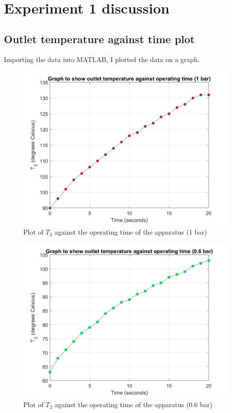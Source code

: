\documentclass[class=article, crop=false, 12pt,a4paper]{standalone}
\begin{document}
\section{Experiment 1 discussion}
\subsection{Outlet temperature against time plot}
Importing the data into MATLAB, I plotted the data on a graph.
\begin{figure}
  \includegraphics[width = 0.9 \textwidth]{./img/T21vsTimeGraph}
  \caption{Plot of \(T_2\) against the operating time of the apparatus (1 bar)}
  \label{ref:T21vsTime1bar}
\end{figure}
\begin{figure}
  \includegraphics[width = 0.9 \textwidth]{./img/T206vsTimeGraph}
  \caption{Plot of \(T_2\) against the operating time of the apparatus (0.6 bar)}
  \label{ref:T206vsTime1bar}
\end{figure}
\end{document}
